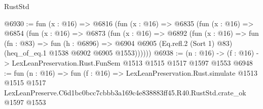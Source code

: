 \begin{lexlean}{RustStd}
\begin{coremodule}
@6930 := fun (x : @16) =>
  @6816
    (fun (x : @16) =>
    @6835
      (fun (x : @16) =>
      @6854
        (fun (x : @16) =>
        @6873
          (fun (x : @16) =>
          @6892
            (fun (x : @16) =>
            fun (fn : @83) =>
            fun (h : @6896) =>
            @6904 @6905 (Eq.refl.{2} (Sort 1) @83) (heq_of_eq.{1} @1538 @6902 @6905 @1553))))))
@6938 := (n : @16) -> (f : @16) -> LexLeanPreservation.Rust.FunSem @1513 @1515 @1517 @1597 @1553
@6948 := fun (n : @16) =>
  fun (f : @16) =>
  LexLeanPreservation.Rust.simulate
    @1513
    @1515
    @1517
    LexLeanPreserve.C6d1bc0bcc7cbbb3a169c4e838883ff45.R40.RustStd.crate_ok
    @1597
    @1553
\end{coremodule}
\end{lexlean}
